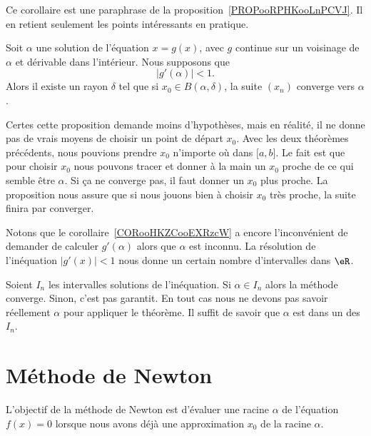 Ce corollaire est une paraphrase de la proposition~\ref{PROPooRPHKooLnPCVJ}. Il en retient seulement les points intéressants en pratique.

\begin{corollary}     \label{CORooHKZCooEXRzcW}
    Soit \( \alpha\) une solution de l'équation \( x=g(x)\), avec \( g\) continue sur un voisinage de \( \alpha\) et dérivable dans l'intérieur. Nous supposons que
    \begin{equation}
        | g'(\alpha) |<1.
    \end{equation}
    Alors il existe un rayon \( \delta\) tel que si \( x_0\in B(\alpha,\delta)\), la suite \( (x_n)\) converge vers \( \alpha\).
\end{corollary}

Certes cette proposition demande moins d'hypothèses, mais en réalité, il ne donne pas de vrais moyens de choisir un point de départ \( x_0\). Avec les deux théorèmes précédents, nous pouvions prendre \( x_0\) n'importe où dans \( \mathopen[ a , b \mathclose]\). Le fait est que pour choisir \( x_0\) nous pouvons tracer et donner à la main un \( x_0\) proche de ce qui semble être \( \alpha\). Si ça ne converge pas, il faut donner un \(x_0\) plus proche. La proposition nous assure que si nous jouons bien à choisir \( x_0\) très proche, la suite finira par converger.

Notons que le corollaire~\ref{CORooHKZCooEXRzcW} a encore l'inconvénient de demander de calculer \( g'(\alpha)\) alors que \( \alpha\) est inconnu. La résolution de l'inéquation \( | g'(x) |<1\) nous donne un certain nombre d'intervalles dans \( \eR\).

Soient \( I_n\) les intervalles solutions de l'inéquation.  Si \( \alpha\in I_n\) alors la méthode converge. Sinon, c'est pas garantit. En tout cas nous ne devons pas savoir réellement \( \alpha\) pour appliquer le théorème. Il suffit de savoir que \( \alpha\) est dans un des \( I_n\).

\section{Méthode de Newton}
\label{SECooIKXNooACLljs}

L'objectif de la méthode de Newton est d'évaluer une racine \( \alpha\) de l'équation \( f(x)=0\) lorsque nous avons déjà une approximation \( x_0\) de la racine \( \alpha\).


